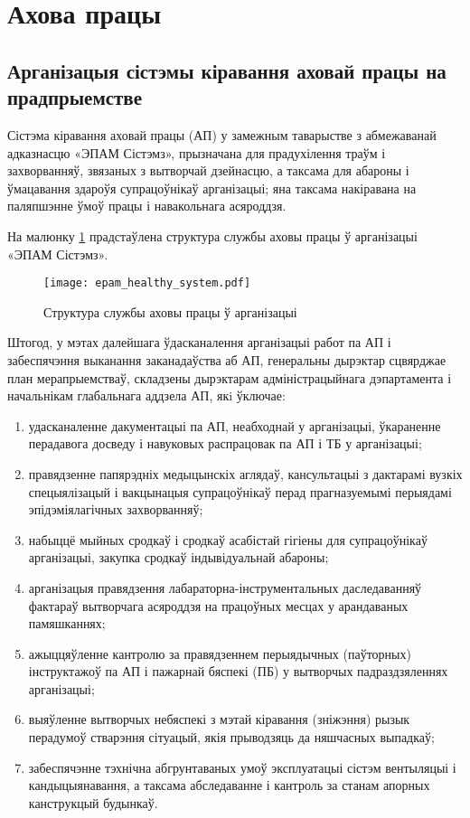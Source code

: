 \section{Ахова працы}

\subsection{Арганізацыя сістэмы кіравання аховай працы на прадпрыемстве}

Сістэма кіравання аховай працы (АП) у замежным таварыстве з абмежаванай адказнасцю «ЭПАМ Сістэмз», прызначана для прадухілення траўм і захворванняў, звязаных з вытворчай дзейнасцю, а таксама для абароны і ўмацавання здароўя супрацоўнікаў арганізацыі; яна таксама накіравана на паляпшэнне ўмоў працы і навакольнага асяроддзя.

На малюнку \ref{img: epam healthy system} прадстаўлена структура службы аховы працы ў арганізацыі «ЭПАМ Сістэмз».

\begin{figure}[h!]
    \centering
    \texttt{[image: epam\_healthy\_system.pdf]}
    \caption{Структура службы аховы працы ў арганізацыі}
    \label{img: epam healthy system} 
\end{figure}

Штогод, у мэтах далейшага ўдасканалення арганізацыі работ па АП і забеспячэння выканання заканадаўства аб АП, генеральны дырэктар сцвярджае план мерапрыемстваў, складзены дырэктарам адміністрацыйнага дэпартамента і начальнікам глабальнага аддзела АП, якi ўключае:
\begin{enumerate}
    \item удасканаленне дакументацыі па АП, неабходнай у арганізацыі, ўкараненне перадавога досведу і навуковых распрацовак па АП і ТБ у арганізацыі;
    \item правядзенне папярэдніх медыцынскіх аглядаў, кансультацыі з дактарамі вузкіх спецыялізацый і вакцынацыя супрацоўнікаў перад прагназуемымі перыядамі эпідэміялагічных захворванняў;
    \item набыццё мыйных сродкаў і сродкаў асабістай гігіены для супрацоўнікаў арганізацыі, закупка сродкаў індывідуальнай абароны;
    \item арганізацыя правядзення лабараторна-інструментальных даследаванняў фактараў вытворчага асяроддзя на працоўных месцах у арандаваных памяшканнях;
    \item ажыццяўленне кантролю за правядзеннем перыядычных (паўторных) інструктажоў па АП і пажарнай бяспекі (ПБ) у вытворчых падраздзяленнях арганізацыі;
    \item выяўленне вытворчых небяспекі з мэтай кіравання (зніжэння) рызык перадумоў стварэння сітуацый, якія прыводзяць да няшчасных выпадкаў;
    \item забеспячэнне тэхнічна абгрунтаваных умоў эксплуатацыі сістэм вентыляцыі і кандыцыянавання, а таксама абследаванне і кантроль за станам апорных канструкцый будынкаў.
\end{enumerate}

